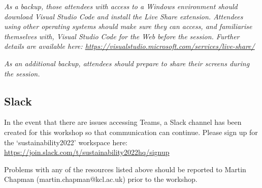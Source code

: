 \documentclass{article}
\begin{document}
\emph{As a backup, those attendees with access to a Windows environment should download \emph{Visual Studio Code} and install the \emph{Live Share} extension.
Attendees using other operating systems should make sure they can access, and familiarise themselves with, \emph{Visual Studio Code for the Web} before the session.
Further details are available here: \href{https://visualstudio.microsoft.com/services/live-share/}{https://visualstudio.microsoft.com/services/live-share/}}

\emph{As an additional backup, attendees should prepare to share their screens during the session.}

\subsection{Slack}

In the event that there are issues accessing Teams, a Slack channel has been created for this workshop so that communication can continue.
Please sign up for the `sustainability2022' workspace here: \newline
\href{https://join.slack.com/t/sustainability2022hq/signup}{https://join.slack.com/t/sustainability2022hq/signup}

Problems with any of the resources listed above should be reported to Martin Chapman (martin.chapman@kcl.ac.uk) prior to the workshop.
\end{document}
